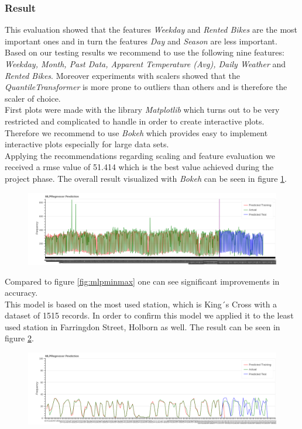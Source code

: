 \subsubsection{Result}\label{sec:resultmlp}
This evaluation showed that the features \emph{Weekday} and \emph{Rented Bikes} are the most important ones and in turn the features \emph{Day} and \emph{Season} are less important.
Based on our testing results we recommend to use the following nine features: \emph{Weekday, Month, Past Data, Apparent Temperature (Avg), Daily Weather} and \emph{Rented Bikes}. 
Moreover experiments with scalers showed that the \emph{QuantileTransformer} is more prone to outliers than others and is therefore the scaler of choice.\\
First plots were made with the library \emph{Matplotlib} which turns out to be very restricted and complicated to handle in order to create interactive plots. Therefore we recommend to use \emph{Bokeh} which provides easy to implement interactive plots especially for large data sets.\\
Applying the recommendations regarding scaling and feature evaluation we received a \acs{rmse} value of 51.414 which is the best value achieved during the project phase. The overall result visualized with \emph{Bokeh} can be seen in figure \ref{fig:mlpquantile}.
\begin{figure}[H]
\hspace{-2.8cm}
\includegraphics[width=1.4\textwidth]{img/mlpquantile}\label{fig:mlpquantile}
\label{fig:mlpquantile}
\end{figure}
Compared to figure \ref{fig:mlpminmax} one can see significant improvements in accuracy.\\
This model is based on the most used station, which is King´s Cross with a dataset of 1515 records. In order to confirm this model we applied it to the least used station in Farringdon Street, Holborn as well. The result can be seen in figure  \ref{fig:mlpquantile_least}.
\begin{figure}[H]
\hspace{-2.8cm}
\includegraphics[width=1.4\textwidth]{img/mlpquantile_least}\label{fig:mlpquantile_least}
\label{fig:mlpquantile_least}
\end{figure}
